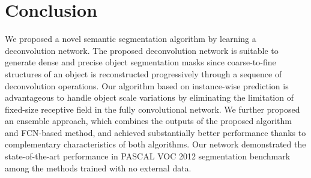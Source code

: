 \documentclass[10pt,twocolumn,letterpaper]{article}
\begin{document}
 
\section{Conclusion}
We proposed a novel semantic segmentation algorithm by learning a deconvolution network.
The proposed deconvolution network is suitable to generate dense and precise object segmentation masks since coarse-to-fine structures of an object is reconstructed progressively through a sequence of deconvolution operations.
Our algorithm based on instance-wise prediction is advantageous to handle object scale variations by eliminating the limitation of fixed-size receptive field in the fully convolutional network.
We further proposed an ensemble approach, which combines the outputs of the proposed algorithm and FCN-based method, and achieved substantially better performance thanks to complementary characteristics of both algorithms.
Our network demonstrated the state-of-the-art performance in PASCAL VOC 2012 segmentation benchmark among the methods trained with no external data.

\newpage

{\small


}
\end{document}
